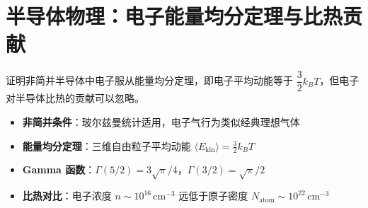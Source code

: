 \section{半导体物理：电子能量均分定理与比热贡献}
\label{sec:equipartition-specific-heat}

\begin{modelbox}[题目：非简并半导体电子的经典统计行为]
证明非简并半导体中电子服从能量均分定理，即电子平均动能等于 $\dfrac{3}{2}k_BT$，但电子对半导体比热的贡献可以忽略。
\end{modelbox}

\begin{tipbox}[考点快速分析]
\begin{itemize}
    \item \textbf{非简并条件}：玻尔兹曼统计适用，电子气行为类似经典理想气体
    \item \textbf{能量均分定理}：三维自由粒子平均动能 $\langle E_{\text{kin}}\rangle=\frac{3}{2}k_BT$
    \item \textbf{Gamma 函数}：$\Gamma(5/2)=3\sqrt{\pi}/4$，$\Gamma(3/2)=\sqrt{\pi}/2$
    \item \textbf{比热对比}：电子浓度 $n\sim10^{16}\,\text{cm}^{-3}$ 远低于原子密度 $N_{\text{atom}}\sim10^{22}\,\text{cm}^{-3}$
\end{itemize}
\end{tipbox}

